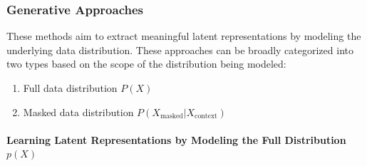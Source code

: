 \subsubsection{Generative Approaches}

These methods aim to extract meaningful latent representations by modeling the underlying data distribution. These approaches can be broadly categorized into two types based on the scope of the distribution being modeled:
\begin{enumerate}
    \item Full data distribution $P(X)$
    \item Masked data distribution $P(X_{\text{masked}}|X_{\text{context}})$
\end{enumerate}

\paragraph{Learning Latent Representations by Modeling the Full Distribution $p(X)$}

